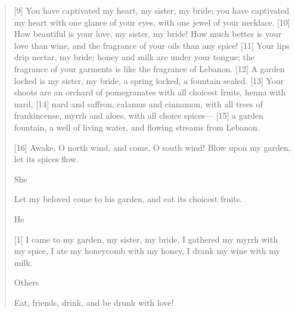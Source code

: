 \begin{quote}
    [9] You have captivated my heart, my sister, my bride;
        you have captivated my heart with one glance of your eyes,
        with one jewel of your necklace.
    [10] How beautiful is your love, my sister, my bride!
        How much better is your love than wine,
        and the fragrance of your oils than any spice!
    [11] Your lips drip nectar, my bride;
        honey and milk are under your tongue;
        the fragrance of your garments is like the fragrance of Lebanon.
    [12] A garden locked is my sister, my bride,
        a spring locked, a fountain sealed.
    [13] Your shoots are an orchard of pomegranates
        with all choicest fruits,
        henna with nard,
    [14] nard and saffron, calamus and cinnamon,
        with all trees of frankincense,
    myrrh and aloes,
        with all choice spices—
    [15] a garden fountain, a well of living water,
        and flowing streams from Lebanon.


    [16] Awake, O north wind,
        and come, O south wind!
    Blow upon my garden,
        let its spices flow.


    She

    Let my beloved come to his garden,
        and eat its choicest fruits.


    He

    [1] I came to my garden, my sister, my bride,
        I gathered my myrrh with my spice,
        I ate my honeycomb with my honey,
        I drank my wine with my milk.


    Others

    Eat, friends, drink,
        and be drunk with love!
  \end{quote}
